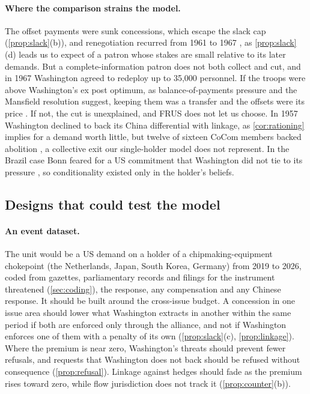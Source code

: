 \paragraph{Where the comparison strains the model.} The offset payments were sunk concessions, which escape the slack cap (\cref{prop:slack}(b)), and renegotiation recurred from 1961 to 1967 \citep{frus1995foreignecon, frus1999germany, frus1995westerneurope}, as \cref{prop:slack}(d) leads us to expect of a patron whose stakes are small relative to its later demands. But a complete-information patron does not both collect and cut, and in 1967 Washington agreed to redeploy up to 35,000 personnel. If the troops were above Washington's ex post optimum, as balance-of-payments pressure and the Mansfield resolution suggest, keeping them was a transfer and the offsets were its price \citep{gavin2004gold, zimmermann2002money}. If not, the cut is unexplained, and FRUS does not let us choose. In 1957 Washington declined to back its China differential with linkage, as \cref{cor:rationing} implies for a demand worth little, but twelve of sixteen CoCom members backed abolition \citep{frus1989economicdefense, mastanduno1992economic}, a collective exit our single-holder model does not represent. In the Brazil case Bonn feared for a US commitment that Washington did not tie to its pressure \citep{frus2014westerneurope}, so conditionality existed only in the holder's beliefs.

\subsection{Designs that could test the model}\label{sec:tests}

\paragraph{An event dataset.} The unit would be a US demand on a holder of a chipmaking-equipment chokepoint (the Netherlands, Japan, South Korea, Germany) from 2019 to 2026, coded from gazettes, parliamentary records and filings for the instrument threatened (\cref{sec:coding}), the response, any compensation and any Chinese response. It should be built around the cross-issue budget. A concession in one issue area should lower what Washington extracts in another within the same period if both are enforced only through the alliance, and not if Washington enforces one of them with a penalty of its own (\cref{prop:slack}(c), \cref{prop:linkage}). Where the premium is near zero, Washington's threats should prevent fewer refusals, and requests that Washington does not back should be refused without consequence (\cref{prop:refusal}). Linkage against hedges should fade as the premium rises toward zero, while flow jurisdiction does not track it (\cref{prop:counter}(b)).

